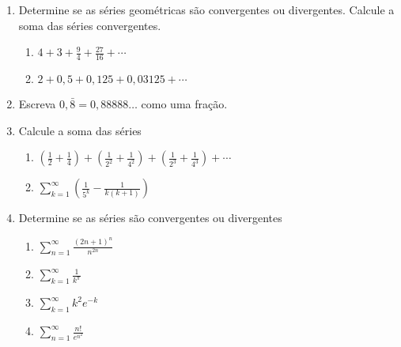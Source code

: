 \documentclass{article}
\newcommand{\ds}{\displaystyle}
\begin{document}
\begin{enumerate}
\begin{enumerate}
		\item $\ds\sum_{k=0}^\infty \ds\frac{1}{(4k+1)(4k+5)}$

			[Dica: utilize a mesma estrat\'egia do item acima.]
		\item $\ds\sum_{k=1}^\infty\ds\frac{n^2}{5n^2+4}$
		\item $\ds\sum_{k=0}^\infty e^{-k}$
		\item $\ds1+\frac{1}{\sqrt[3]{2}}+\frac{1}{\sqrt[3]{3}}+\cdots+\frac{1}{\sqrt[3]{n}}+\cdots$
	\end{enumerate}

\item Determine se as s\'eries geom\'etricas s\~ao convergentes ou divergentes. Calcule a soma das s\'eries convergentes.
	\begin{enumerate}
		\item $\ds4+3+\frac{9}{4}+\frac{27}{16}+\cdots$
		\item $\ds2+0,5+0,125+0,03125+\cdots$
	\end{enumerate}

\item Escreva $0,\bar{8} = 0,88888\ldots$ como uma fra\c{c}\~ao.

\item Calcule a soma das s\'eries
	\begin{enumerate}
		\item $\ds\left(\frac{1}{2}+\frac{1}{4}\right)+\left(\frac{1}{2^2}+\frac{1}{4^2}\right)+\left(\frac{1}{2^3}+\frac{1}{4^3}\right)+\cdots$
		\item $\ds\sum_{k=1}^\infty \left(\frac{1}{5^k} - \frac{1}{k(k+1)}\right)$
	\end{enumerate}

\item Determine se as s\'eries s\~ao convergentes ou divergentes
	\begin{enumerate}
		\item $\ds\sum_{n=1}^\infty \frac{(2n+1)^n}{n^{2n}}$
		\item $\ds\sum_{k=1}^\infty \frac{1}{k^\pi}$
		\item $\ds\sum_{k=1}^\infty k^2 e^{-k}$
		\item $\ds\sum_{n=1}^\infty \frac{n!}{e^{n^2}}$
	\end{enumerate}


\end{enumerate}
\end{document}
